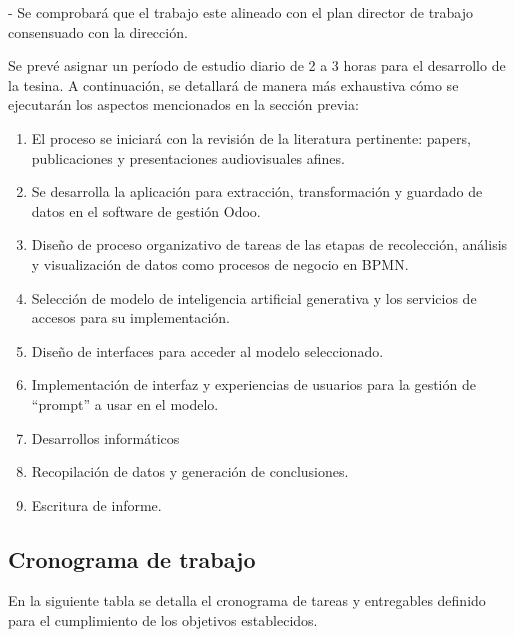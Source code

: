 \documentclass[12pt]{article}
\begin{document}
- Se comprobará que el trabajo este alineado con el plan director de trabajo consensuado con la dirección.


\vspace{1cm}

Se prevé asignar un período de estudio diario de 2 a 3 horas para el desarrollo de la tesina. A continuación, se detallará de manera más exhaustiva cómo se ejecutarán los aspectos mencionados en la sección previa:

\begin{enumerate}
    \item El proceso se iniciará con la revisión de la literatura pertinente: papers, publicaciones y presentaciones audiovisuales afines.
    \item Se desarrolla la aplicación para extracción, transformación y guardado de datos en el software de gestión Odoo.
    \item Diseño de proceso organizativo de tareas de las etapas de recolección, análisis y visualización de datos como procesos de negocio en BPMN.
    \item Selección de modelo de inteligencia artificial generativa y los servicios de accesos para su implementación.
    \item Diseño de interfaces para acceder al modelo seleccionado.
    \item Implementación de interfaz y experiencias de usuarios para la gestión de ``prompt'' a usar en el modelo.
    \item Desarrollos informáticos 
    \item Recopilación de datos y generación de conclusiones.
    \item Escritura de informe.
\end{enumerate}


\subsection{Cronograma de trabajo}

En la siguiente tabla se detalla el cronograma de tareas y entregables definido para el cumplimiento de los objetivos establecidos. 
\end{document}
